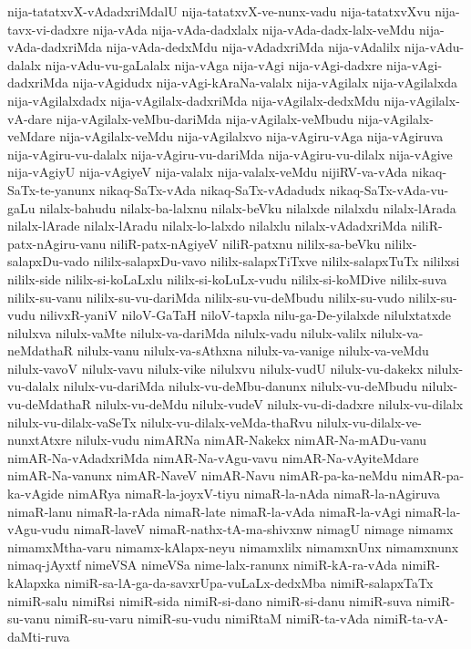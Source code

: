 {nija-tatatxvX-vAdadxriMdalU
nija-tatatxvX-ve-nunx-vadu
nija-tatatxvXvu
nija-tavx-vi-dadxre
nija-vAda
nija-vAda-dadxlalx
nija-vAda-dadx-lalx-veMdu
nija-vAda-dadxriMda
nija-vAda-dedxMdu
nija-vAdadxriMda
nija-vAdalilx
nija-vAdu-dalalx
nija-vAdu-vu-gaLalalx
nija-vAga
nija-vAgi
nija-vAgi-dadxre
nija-vAgi-dadxriMda
nija-vAgidudx
nija-vAgi-kAraNa-valalx
nija-vAgilalx
nija-vAgilalxda
nija-vAgilalxdadx
nija-vAgilalx-dadxriMda
nija-vAgilalx-dedxMdu
nija-vAgilalx-vA-dare
nija-vAgilalx-veMbu-dariMda
nija-vAgilalx-veMbudu
nija-vAgilalx-veMdare
nija-vAgilalx-veMdu
nija-vAgilalxvo
nija-vAgiru-vAga
nija-vAgiruva
nija-vAgiru-vu-dalalx
nija-vAgiru-vu-dariMda
nija-vAgiru-vu-dilalx
nija-vAgive
nija-vAgiyU
nija-vAgiyeV
nija-valalx
nija-valalx-veMdu
nijiRV-va-vAda
nikaq-SaTx-te-yanunx
nikaq-SaTx-vAda
nikaq-SaTx-vAdadudx
nikaq-SaTx-vAda-vu-gaLu
nilalx-bahudu
nilalx-ba-lalxnu
nilalx-beVku
nilalxde
nilalxdu
nilalx-lArada
nilalx-lArade
nilalx-lAradu
nilalx-lo-lalxdo
nilalxlu
nilalx-vAdadxriMda
niliR-patx-nAgiru-vanu
niliR-patx-nAgiyeV
niliR-patxnu
nililx-sa-beVku
nililx-salapxDu-vado
nililx-salapxDu-vavo
nililx-salapxTiTxve
nililx-salapxTuTx
nililxsi
nililx-side
nililx-si-koLaLxlu
nililx-si-koLuLx-vudu
nililx-si-koMDive
nililx-suva
nililx-su-vanu
nililx-su-vu-dariMda
nililx-su-vu-deMbudu
nililx-su-vudo
nililx-su-vudu
nilivxR-yaniV
niloV-GaTaH
niloV-tapxla
nilu-ga-De-yilalxde
nilulxtatxde
nilulxva
nilulx-vaMte
nilulx-va-dariMda
nilulx-vadu
nilulx-valilx
nilulx-va-neMdathaR
nilulx-vanu
nilulx-va-sAthxna
nilulx-va-vanige
nilulx-va-veMdu
nilulx-vavoV
nilulx-vavu
nilulx-vike
nilulxvu
nilulx-vudU
nilulx-vu-dakekx
nilulx-vu-dalalx
nilulx-vu-dariMda
nilulx-vu-deMbu-danunx
nilulx-vu-deMbudu
nilulx-vu-deMdathaR
nilulx-vu-deMdu
nilulx-vudeV
nilulx-vu-di-dadxre
nilulx-vu-dilalx
nilulx-vu-dilalx-vaSeTx
nilulx-vu-dilalx-veMda-thaRvu
nilulx-vu-dilalx-ve-nunxtAtxre
nilulx-vudu
nimARNa
nimAR-Nakekx
nimAR-Na-mADu-vanu
nimAR-Na-vAdadxriMda
nimAR-Na-vAgu-vavu
nimAR-Na-vAyiteMdare
nimAR-Na-vanunx
nimAR-NaveV
nimAR-Navu
nimAR-pa-ka-neMdu
nimAR-pa-ka-vAgide
nimARya
nimaR-la-joyxV-tiyu
nimaR-la-nAda
nimaR-la-nAgiruva
nimaR-lanu
nimaR-la-rAda
nimaR-late
nimaR-la-vAda
nimaR-la-vAgi
nimaR-la-vAgu-vudu
nimaR-laveV
nimaR-nathx-tA-ma-shivxnw
nimagU
nimage
nimamx
nimamxMtha-varu
nimamx-kAlapx-neyu
nimamxlilx
nimamxnUnx
nimamxnunx
nimaq-jAyxtf
nimeVSA
nimeVSa
nime-lalx-ranunx
nimiR-kA-ra-vAda
nimiR-kAlapxka
nimiR-sa-lA-ga-da-savxrUpa-vuLaLx-dedxMba
nimiR-salapxTaTx
nimiR-salu
nimiRsi
nimiR-sida
nimiR-si-dano
nimiR-si-danu
nimiR-suva
nimiR-su-vanu
nimiR-su-varu
nimiR-su-vudu
nimiRtaM
nimiR-ta-vAda
nimiR-ta-vA-daMti-ruva
}
